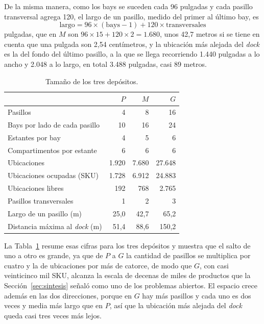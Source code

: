 De la misma manera, como los bays se suceden cada 96 pulgadas y cada pasillo transversal agrega 120, el largo de un pasillo, medido del primer al último bay, es
\begin{equation}
    \text{largo} = 96 \times (\text{bays} - 1) + 120 \times \text{transversales}
    \label{eq:largo-pasillo}
\end{equation}
pulgadas, que en $M$ son $96 \times 15 + 120 \times 2 = 1.680$, unos 42,7 metros si se tiene en cuenta que una pulgada son 2,54 centímetros, y la ubicación más alejada del \emph{dock} es la del fondo del último pasillo, a la que se llega recorriendo 1.440 pulgadas a lo ancho y 2.048 a lo largo, en total 3.488 pulgadas, casi 89 metros.

\begin{table}[htbp]
    \centering
    \begin{tabular}{|l|r|r|r|}
        \hline
         & \textbf{$P$} & \textbf{$M$} & \textbf{$G$} \\
        \hline
        Pasillos & 4 & 8 & 16 \\
        \hline
        Bays por lado de cada pasillo & 10 & 16 & 24 \\
        \hline
        Estantes por bay & 4 & 5 & 6 \\
        \hline
        Compartimentos por estante & 6 & 6 & 6 \\
        \hline
        Ubicaciones & 1.920 & 7.680 & 27.648 \\
        \hline
        Ubicaciones ocupadas (SKU) & 1.728 & 6.912 & 24.883 \\
        \hline
        Ubicaciones libres & 192 & 768 & 2.765 \\
        \hline
        Pasillos transversales & 1 & 2 & 3 \\
        \hline
        Largo de un pasillo (m) & 25,0 & 42,7 & 65,2 \\
        \hline
        Distancia máxima al \emph{dock} (m) & 51,4 & 88,6 & 150,2 \\
        \hline
    \end{tabular}
    \caption{Tamaño de los tres depósitos.}
    \label{tab:tamanos-depositos}
\end{table}

La Tabla~\ref{tab:tamanos-depositos} resume esas cifras para los tres depósitos y muestra que el salto de uno a otro es grande, ya que de $P$ a $G$ la cantidad de pasillos se multiplica por cuatro y la de ubicaciones por más de catorce, de modo que $G$, con casi veinticinco mil SKU, alcanza la escala de decenas de miles de productos que la Sección~\ref{sec:sintesis} señaló como uno de los problemas abiertos.
El espacio crece además en las dos direcciones, porque en $G$ hay más pasillos y cada uno es dos veces y media más largo que en $P$, así que la ubicación más alejada del \emph{dock} queda casi tres veces más lejos.

